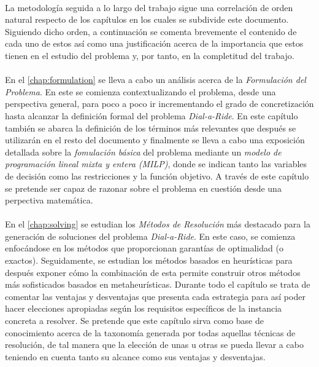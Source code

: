 \documentclass{subfiles}
\begin{document}
      \paragraph{}
      La metodología seguida a lo largo del trabajo sigue una correlación de orden natural respecto de los capítulos en los cuales se subdivide este documento. Siguiendo dicho orden, a continuación se comenta brevemente el contenido de cada uno de estos así como una justificación acerca de la importancia que estos tienen en el estudio del problema y, por tanto, en la completitud del trabajo.

      \paragraph{}
      En el \cref{chap:formulation} se lleva a cabo un análisis acerca de la \emph{Formulación del Problema}. En este se comienza contextualizando el problema, desde una perspectiva general, para poco a poco ir incrementando el grado de concretización hasta alcanzar la definición formal del problema \emph{Dial-a-Ride}. En este capítulo también se abarca la definición de los términos más relevantes que después se utilizarán en el resto del documento y finalmente se lleva a cabo una exposición detallada sobre la \emph{fomulación básica} del problema mediante un \emph{modelo de programación lineal mixta y entera (MILP)}, donde se indican tanto las variables de decisión como las restricciones y la función objetivo. A través de este capítulo se pretende ser capaz de razonar sobre el problema en cuestión desde una perpectiva matemática.

      \paragraph{}
      En el \cref{chap:solving} se estudian los \emph{Métodos de Resolución} más destacado para la generación de soluciones del problema \emph{Dial-a-Ride}. En este caso, se comienza enfocándose en los métodos que proporcionan garantías de optimalidad (o exactos). Seguidamente, se estudian los métodos basados en heurísticas para después exponer cómo la combinación de esta permite construir otros métodos más sofisticados basados en metaheurísticas. Durante todo el capítulo se trata de comentar las ventajas y desventajas que presenta cada estrategia para así poder hacer elecciones apropiadas según los requisitos específicos de la instancia concreta a resolver. Se pretende que este capítulo sirva como base de conocimiento acerca de la taxonomía generada por todas aquellas técnicas de resolución, de tal manera que la elección de unas u otras se pueda llevar a cabo teniendo en cuenta tanto su alcance como sus ventajas y desventajas.
\end{document}
